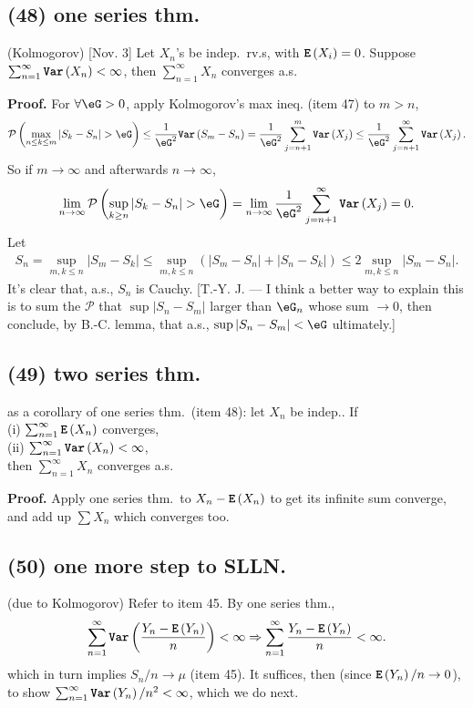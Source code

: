 \documentclass[12pt]{article}
\newcommand{\oo}\infty%
\newcommand{\F}\frac%
\newcommand{\Ev}\forall%
\newcommand{\Ip}{\Rightarrow} %
\newcommand{\Rb}[1]{ \left( #1 \right) }%
\newcommand{\CF}[1]{ \mathcal{#1} }%
\newcommand{\Ss}[1]{\textsf{\bfseries{#1}}}%
\newcommand{\Tw}[1]{\texttt{\bfseries{#1}}}%
\newcommand{\EqGo}[1]{ \begin{gather*}{#1}\end{gather*} } %
\renewcommand{\P}[1]{ \CF P \Rb{#1} }%
\newcommand{\E}[1]{ \Tw{E}\Rb{#1} }%
\newcommand{\Var}[1]{ \Tw{Var}\Rb{#1} }%
\begin{document}
\subsection*{(48) one series thm.} (Kolmogorov) [Nov. 3] Let \(X_n\)'s be indep.\ rv.s, with \(\E{X_i} =0\). 
Suppose \(\sum_{n=1}^\oo \Var{X_n} <\oo \), 
then \(\sum_{n=1}^\oo X_n\) converges a.s. \par
\Ss{Proof.} For \(\Ev \eG >0\), apply Kolmogorov's max ineq. (item 47) to \(m>n\), \EqGo{
 \P{ \max_{n \leq k \leq m} |S_k -S_n| >\eG} 
 \leq \F{1}{\eG^2} \Var{S_m -S_n} 
 = \F{1}{\eG^2} \sum_{j=n+1}^m \Var{X_j} 
 \leq \F{1}{\eG^2} \sum_{j=n+1}^\oo \Var{X_j}. 
} So if \(m \to \oo\) and afterwards \(n \to \oo\), \EqGo{
 \lim_{n \to \oo} \P{\sup_{k \geq n} |S_k -S_n| >\eG} 
 = \lim_{n \to \oo} \F{1}{\eG^2} \sum_{j=n+1}^\oo \Var{X_j} =0.
} Let \EqGo{
 S_n
 = \sup_{m,k \leq n} |S_m -S_k|
 \leq \sup_{m,k \leq n} (|S_m -S_n| +|S_n -S_k|)
 \leq 2 \sup_{m,k \leq n} |S_m -S_n|.
} It's clear that, a.s., \(S_n\) is Cauchy. 
[T.-Y. J. --- I think a better way to explain this is to sum the \(\CF{P}\) that \(\sup |S_n-S_m|\) larger than \(\eG_n\) whose sum \(\to 0\), then conclude, by B.-C. lemma, that a.s.,  \(\sup |S_n-S_m| <\eG\) ultimately.]

\subsection*{(49) two series thm.} as a corollary of one series thm.\ (item 48): let \(X_n\) be indep.. 
If \\
\indent (i) \(\sum_{n=1}^\oo \E{X_n}\) converges, \\
\indent (ii) \(\sum_{n=1}^\oo \Var{X_n} <\oo \), \\
then \(\sum_{n=1}^\oo X_n\) converges a.s. \par
\Ss{Proof.} Apply one series thm.\ to \(X_n -\E{X_n}\) to get its infinite sum converge, and add up \(\sum X_n\) which converges too. 

\subsection*{(50) one more step to SLLN.} (due to Kolmogorov) Refer to item 45. 
By one series thm., \EqGo{
 \sum_{n=1}^\oo \Var{ \F{Y_n -\E{Y_n}}{n} } <\oo
 \Ip \sum_{n=1}^\oo \F{Y_n -\E{Y_n}}{n} <\oo.
} which in turn implies \(S_n/n \to \mu\) (item 45). 
It suffices, then (since \(\E{Y_n} /n \to 0\)), to show \(\sum_{n=1}^\oo \Var{Y_n} /n^2 <\oo\), which we do next. 
\end{document}
